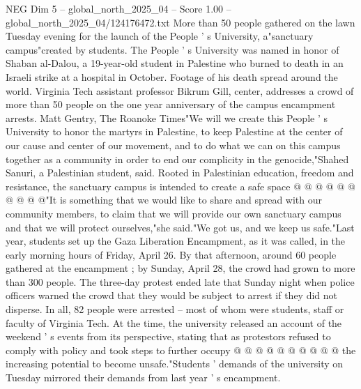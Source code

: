 \begin{textsample}{NEG Dim 5 – global\_north\_2025\_04 – Score 1.00 – global\_north\_2025\_04/124176472.txt}  \label{ex:f5_neg_341}
More than 50 people gathered on the lawn Tuesday evening for the launch of the People ' s University, a"sanctuary campus"created by students.
The People ' s University was named in honor of Shaban al-Dalou, a 19-year-old student in Palestine who burned to death in an Israeli strike at a hospital in October.
Footage of his death spread around the world.
Virginia Tech assistant professor Bikrum Gill, center, addresses a crowd of more than 50 people on the one year anniversary of the campus encampment arrests.
Matt Gentry, The Roanoke Times"We will we create this People ' s University to honor the martyrs in Palestine, to keep Palestine at the center of our cause and center of our movement, and to do what we can on this campus together as a community in order to end our complicity in the genocide,"Shahed Sanuri, a Palestinian student, said.
Rooted in Palestinian education, freedom and resistance, the sanctuary campus is intended to create a safe space @ @ @ @ @ @ @ @ @ @"It is something that we would like to share and spread with our community members, to claim that we will provide our own sanctuary campus and that we will protect ourselves,"she said."We got us, and we keep us safe."Last year, students set up the Gaza Liberation Encampment, as it was called, in the early morning hours of Friday, April 26.
By that afternoon, around 60 people gathered at the encampment ; by Sunday, April 28, the crowd had grown to more than 300 people.
The three-day protest ended late that Sunday night when police officers warned the crowd that they would be subject to arrest if they did not disperse.
In all, 82 people were arrested -- most of whom were students, staff or faculty of Virginia Tech.
At the time, the university released an account of the weekend ' s events from its perspective, stating that as protestors refused to comply with policy and took steps to further occupy @ @ @ @ @ @ @ @ @ @ the increasing potential to become unsafe."Students ' demands of the university on Tuesday mirrored their demands from last year ' s encampment.

\end{textsample}
